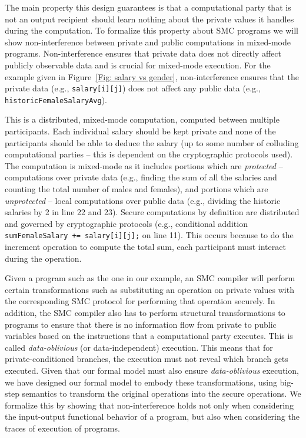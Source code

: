 The main property this design guarantees is that  a computational party that is not an output recipient should learn nothing about the private values it handles during the computation.  To formalize this property about SMC programs we will show non-interference between private and public computations in mixed-mode programs. Non-interference ensures that private data does not directly affect publicly observable data and is crucial for mixed-mode execution. For the example given in Figure~\ref{Fig: salary vs gender}, non-interference ensures that the private data (e.g., \texttt{salary[i][j]}) does not affect any public data (e.g., \texttt{historicFemaleSalaryAvg}).

This is a distributed, mixed-mode computation, computed between multiple participants. Each individual salary should be kept private and none of the participants should be able to deduce  the salary (up to some number of colluding computational parties -- this is dependent on the cryptographic protocols used).
The computation is mixed-mode as it includes portions which are {\em protected} -- computations over private data (e.g., finding the sum of all the salaries and counting the total number of males and females), and portions which are {\em unprotected} -- local computations over public data (e.g., dividing the historic salaries by 2 in line 22 and 23). 
Secure computations by definition are distributed and governed by cryptographic protocols (e.g., conditional addition \texttt{sumFemaleSalary += salary[i][j];} on line 11).   This occurs because to do the increment operation to compute the total sum, each participant must interact during the operation. 


Given a program such as the one in our example, an SMC compiler will perform certain transformations such as substituting an operation on private values with the corresponding SMC protocol for performing that operation securely.  In addition, the SMC compiler also has to perform structural transformations to programs to ensure that there is no information flow from private to public variables based on the instructions that a computational party executes. This is called \emph{data-oblivious} (or data-independent) execution. This means that for private-conditioned branches, the execution must not reveal which branch gets executed.  
Given that our formal model must also ensure \emph{data-oblivious} execution, we have designed our formal model to embody these transformations, using big-step semantics to transform the original operations into the secure operations.  
We formalize this by showing that non-interference holds not only when considering the input-output functional behavior of a program, but also when considering the traces of execution of programs.












